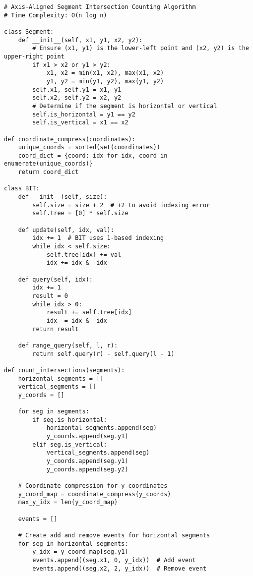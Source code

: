 \documentclass{article}
\begin{document}
\begin{verbatim}
# Axis-Aligned Segment Intersection Counting Algorithm
# Time Complexity: O(n log n)

class Segment:
    def __init__(self, x1, y1, x2, y2):
        # Ensure (x1, y1) is the lower-left point and (x2, y2) is the upper-right point
        if x1 > x2 or y1 > y2:
            x1, x2 = min(x1, x2), max(x1, x2)
            y1, y2 = min(y1, y2), max(y1, y2)
        self.x1, self.y1 = x1, y1
        self.x2, self.y2 = x2, y2
        # Determine if the segment is horizontal or vertical
        self.is_horizontal = y1 == y2
        self.is_vertical = x1 == x2

def coordinate_compress(coordinates):
    unique_coords = sorted(set(coordinates))
    coord_dict = {coord: idx for idx, coord in enumerate(unique_coords)}
    return coord_dict

class BIT:
    def __init__(self, size):
        self.size = size + 2  # +2 to avoid indexing error
        self.tree = [0] * self.size

    def update(self, idx, val):
        idx += 1  # BIT uses 1-based indexing
        while idx < self.size:
            self.tree[idx] += val
            idx += idx & -idx

    def query(self, idx):
        idx += 1
        result = 0
        while idx > 0:
            result += self.tree[idx]
            idx -= idx & -idx
        return result

    def range_query(self, l, r):
        return self.query(r) - self.query(l - 1)

def count_intersections(segments):
    horizontal_segments = []
    vertical_segments = []
    y_coords = []

    for seg in segments:
        if seg.is_horizontal:
            horizontal_segments.append(seg)
            y_coords.append(seg.y1)
        elif seg.is_vertical:
            vertical_segments.append(seg)
            y_coords.append(seg.y1)
            y_coords.append(seg.y2)

    # Coordinate compression for y-coordinates
    y_coord_map = coordinate_compress(y_coords)
    max_y_idx = len(y_coord_map)

    events = []

    # Create add and remove events for horizontal segments
    for seg in horizontal_segments:
        y_idx = y_coord_map[seg.y1]
        events.append((seg.x1, 0, y_idx))  # Add event
        events.append((seg.x2, 2, y_idx))  # Remove event


\end{verbatim}
\end{document}
